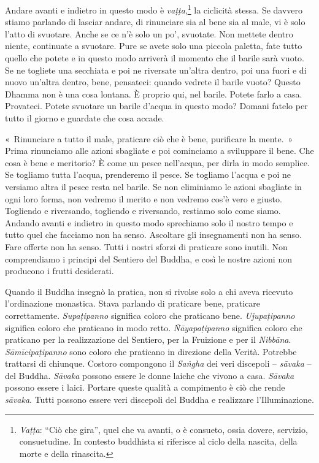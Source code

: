 Andare avanti e indietro in questo modo è \emph{vaṭṭa},\footnote{\emph{Vaṭṭa}:
  ``Ciò che gira'', quel che va avanti, o è consueto, ossia dovere,
  servizio, consuetudine. In contesto buddhista si riferisce al ciclo
  della nascita, della morte e della rinascita.} la ciclicità stessa. Se
davvero stiamo parlando di lasciar andare, di rinunciare sia al bene sia
al male, vi è solo l'atto di svuotare. Anche se ce n'è solo un po',
svuotate. Non mettete dentro niente, continuate a svuotare. Pure se
avete solo una piccola paletta, fate tutto quello che potete e in questo
modo arriverà il momento che il barile sarà vuoto. Se ne togliete una
secchiata e poi ne riversate un'altra dentro, poi una fuori e di nuovo
un'altra dentro, bene, pensateci: quando vedrete il barile vuoto? Questo
Dhamma non è una cosa lontana. È proprio qui, nel barile. Potete farlo a
casa. Provateci. Potete svuotare un barile d'acqua in questo modo?
Domani fatelo per tutto il giorno e guardate che cosa accade.

«~Rinunciare a tutto il male, praticare ciò che è bene, purificare la
mente.~» Prima rinunciamo alle azioni sbagliate e poi cominciamo a
sviluppare il bene. Che cosa è bene e meritorio? È come un pesce
nell'acqua, per dirla in modo semplice. Se togliamo tutta l'acqua,
prenderemo il pesce. Se togliamo l'acqua e poi ne versiamo altra il
pesce resta nel barile. Se non eliminiamo le azioni sbagliate in ogni
loro forma, non vedremo il merito e non vedremo cos'è vero e giusto.
Togliendo e riversando, togliendo e riversando, restiamo solo come
siamo. Andando avanti e indietro in questo modo sprechiamo solo il
nostro tempo e tutto quel che facciamo non ha senso. Ascoltare gli
insegnamenti non ha senso. Fare offerte non ha senso. Tutti i nostri
sforzi di praticare sono inutili. Non comprendiamo i principi del
Sentiero del Buddha, e così le nostre azioni non producono i frutti
desiderati.

Quando il Buddha insegnò la pratica, non si rivolse solo a chi aveva
ricevuto l'ordinazione monastica. Stava parlando di praticare bene,
praticare correttamente. \emph{Supaṭipanno} significa coloro che
praticano bene. \emph{Ujupaṭipanno} significa coloro che praticano in
modo retto. \emph{Ñāyapaṭipanno} significa coloro che praticano per la
realizzazione del Sentiero, per la Fruizione e per il \emph{Nibbāna}.
\emph{Sāmīcipaṭipanno} sono coloro che praticano in direzione della
Verità. Potrebbe trattarsi di chiunque. Costoro compongono il
\emph{Saṅgha} dei veri discepoli -- \emph{sāvaka} -- del Buddha.
\emph{Sāvaka} possono essere le donne laiche che vivono a casa.
\emph{Sāvaka} possono essere i laici. Portare queste qualità a
compimento è ciò che rende \emph{sāvaka}. Tutti possono essere veri
discepoli del Buddha e realizzare l'Illuminazione.

